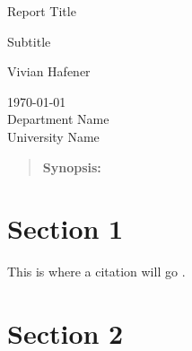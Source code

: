 
\usepackage[
backend=biber,
style=alphabetic,
]{biblatex}




\begin{titlepage}
    \begin{center}
        \vspace*{1cm}
 
        \begin{center}\begin{Huge}
            Report Title
        \end{Huge}\end{center}
        
        \begin{center}\begin{Large}
            Subtitle
        \end{Large}\end{center}

        \begin{center}
            Vivian Hafener
        \end{center}
   
        \vfill
             
        \today \\
        Department Name\\
        University Name             
    \end{center}
 \end{titlepage}


\begin{quotation}
	\noindent \textbf{Synopsis:} \lipsum[1]
\end{quotation}

\tableofcontents

\section{Section 1}

\lipsum[2-3]

This is where a citation will go \cite{latexcompanion}.

\section{Section 2}

\lipsum[4-5]

\printbibliography


